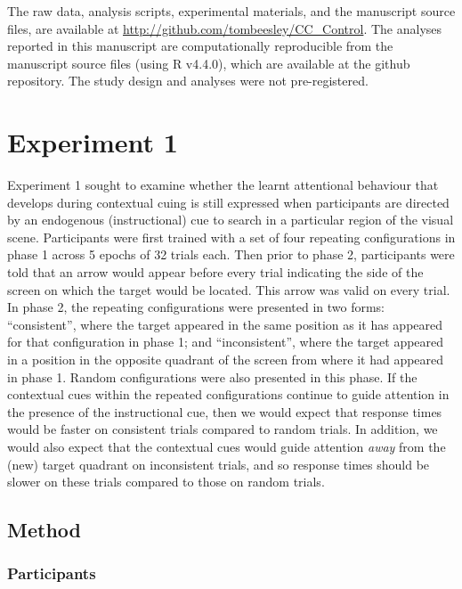 \documentclass[
  man,
  floatsintext,
  longtable,
  nolmodern,
  notxfonts,
  notimes,
  colorlinks=true,linkcolor=blue,citecolor=blue,urlcolor=blue]{apa7}
\begin{document}
The raw data, analysis scripts, experimental materials, and the
manuscript source files, are available at
\url{http://github.com/tombeesley/CC_Control}. The analyses reported in
this manuscript are computationally reproducible from the manuscript
source files (using R v4.4.0), which are available at the github
repository. The study design and analyses were not pre-registered.

\section{Experiment 1}\label{experiment-1}

Experiment 1 sought to examine whether the learnt attentional behaviour
that develops during contextual cuing is still expressed when
participants are directed by an endogenous (instructional) cue to search
in a particular region of the visual scene. Participants were first
trained with a set of four repeating configurations in phase 1 across 5
epochs of 32 trials each. Then prior to phase 2, participants were told
that an arrow would appear before every trial indicating the side of the
screen on which the target would be located. This arrow was valid on
every trial. In phase 2, the repeating configurations were presented in
two forms: ``consistent'', where the target appeared in the same
position as it has appeared for that configuration in phase 1; and
``inconsistent'', where the target appeared in a position in the
opposite quadrant of the screen from where it had appeared in phase 1.
Random configurations were also presented in this phase. If the
contextual cues within the repeated configurations continue to guide
attention in the presence of the instructional cue, then we would expect
that response times would be faster on consistent trials compared to
random trials. In addition, we would also expect that the contextual
cues would guide attention \emph{away} from the (new) target quadrant on
inconsistent trials, and so response times should be slower on these
trials compared to those on random trials.

\subsection{Method}\label{method}

\subsubsection{Participants}\label{participants}
\end{document}
